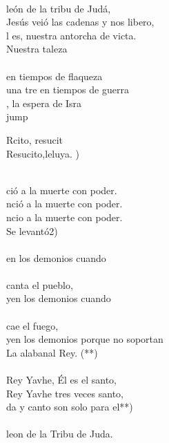 \begin{cancion}%
	     \chord{(}{**)}{    }\\
	león de la tribu de Judá,\\
	Jesús veió las cadenas y nos libero,\\
	l es, nuestra antorcha de victa.\\
	Nuestra taleza \\
	\jump\\
en tiempos de flaqueza \\
	una tre en tiempos de guerra\\
	, la espera de Isra\\jump\\
	\begin{chorus}%
	Rcito, resucit \\
	Resucito,leluya. )\\
	\end{chorus}%
	\jump\\
	ció a la muerte con poder.\\
	nció a la muerte con poder.\\
	ncio a la muerte con poder.\\
	Se levantó2) \\
	\jump\\
	en los demonios cuando \\
	\jump\\
canta el pueblo,\\
	yen los demonios cuando \\
	\jump\\
cae el fuego,\\
	yen los demonios porque no soportan\\
	La alabanal Rey. (**)\\
	\jump\\
	 Rey Yavhe, Él es el santo,\\
	 Rey Yavhe tres veces santo,\\
	da y canto son solo para el**)\\
	\jump\\
	leon de la Tribu de Juda.\\
\end{cancion}%
